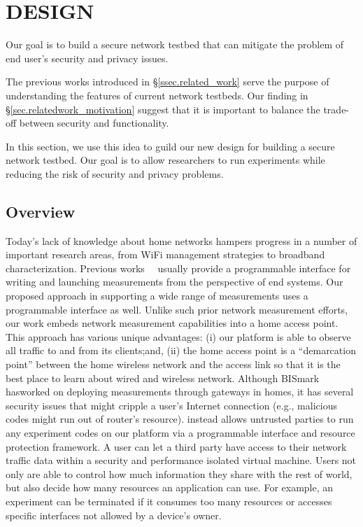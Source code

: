\chapter{\sysname DESIGN}
\label{sec.design}
Our goal is to build a secure network testbed that can mitigate the problem
of end user's security and privacy issues.

The previous works introduced in \S{\ref{ssec.related_work}} serve the purpose of understanding the features of current network testbeds. Our finding in \S{\ref{sec.relatedwork_motivation}} suggest that it is important to balance the trade-off between security and functionality.

In this section, we use this idea to guild our new design for building a secure
 network testbed. Our goal is to allow researchers to run experiments while
 reducing the risk of security and privacy problems.

\section{Overview}
Today's lack of knowledge about home networks hampers progress in a number of
important research areas, from WiFi management strategies to broadband characterization.
Previous works~\cite{sanchez2014measurement}~\cite{dhawan2012fathom} usually provide
 a programmable interface for writing and launching measurements from the perspective of
end systems. Our proposed approach in supporting a wide range of measurements uses
a programmable interface as well. Unlike such prior network measurement efforts,
 our work embeds network measurement capabilities into a home access point.
This approach has various unique advantages: (i) our platform is able to observe
all traffic to and from its clients;and,
(ii) the home access point is a ``demarcation point'' between the home wireless network and
the access link so that it is the best place to learn about wired and wireless network.
 Although BISmark~\cite{183951} hasworked on deploying measurements through
 gateways in homes, it has several security issues
 that might cripple a user's Internet connection (e.g., malicious codes might
 run out of router's resource). \sysname instead allows untrusted parties to run
  any experiment codes on our platform via a programmable interface and
  resource protection framework. A user can let a third party have access to
  their network traffic data within a security and performance isolated
  virtual machine. Users not only are able to control how much information they
share with the rest of world, but also decide how many resources an application can use.
 For example, an experiment can be terminated if it consumes too many resources
  or accesses specific interfaces not allowed by a device's owner.

